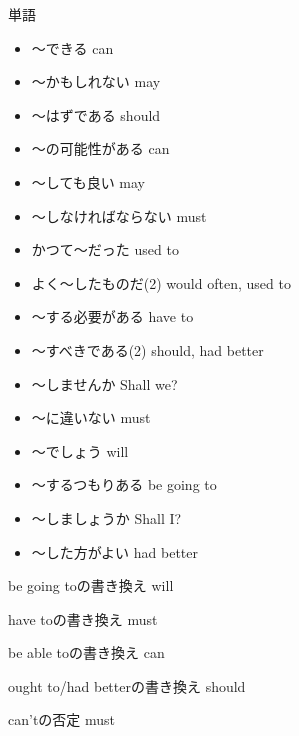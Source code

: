 \documentclass[10pt]{jsarticle}
\newcommand{\answer}[2]{{\color{orange}#2}}
\newcommand{\answer}[2]{\vspace{#1mm}}
\begin{document}
\begin{itembox}[l]{単語}
	\begin{multicols}{2}
		\begin{itemize}
			\item 〜できる \answer{5}{can}
			\item 〜かもしれない \answer{5}{may}
			\item 〜はずである \answer{5}{should}
			\item 〜の可能性がある \answer{5}{can}
			\item 〜しても良い \answer{5}{may}
			\item 〜しなければならない \answer{5}{must}
			\item かつて〜だった \answer{5}{used to}
			\item よく〜したものだ(2) \answer{5}{would often, used to}
			\item 〜する必要がある \answer{5}{have to}
			\item 〜すべきである(2) \answer{5}{should, had better}
			\item 〜しませんか \answer{5}{Shall we?}
			\item 〜に違いない \answer{5}{must}

			\item 〜でしょう \answer{5}{will}
			\item 〜するつもりある \answer{5}{be going to}
			\item 〜しましょうか \answer{5}{Shall I?}
			\item 〜した方がよい \answer{5}{had better}
		\end{itemize}
	\end{multicols}
\end{itembox}


\begin{multicols}{2}
	\begin{itembox}[l]{be going toの書き換え}
		\answer{8}{will}
	\end{itembox}
	\begin{itembox}[l]{have toの書き換え}
		\answer{8}{must}
	\end{itembox}
	\begin{itembox}[l]{be able toの書き換え}
		\answer{8}{can}
	\end{itembox}
	\begin{itembox}[l]{ought to/had betterの書き換え}
		\answer{8}{should}
	\end{itembox}
	\begin{itembox}[l]{can'tの否定}
		\answer{8}{must}
	\end{itembox}
\end{multicols}
\end{document}
